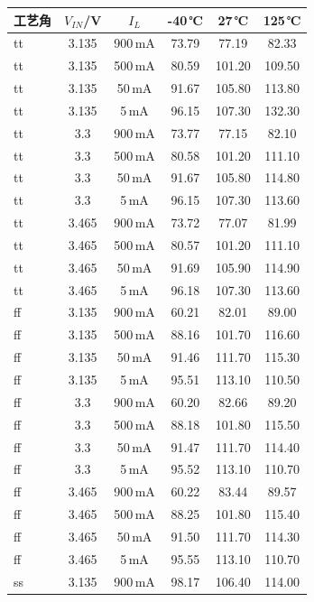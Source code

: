 \documentclass[a4paper, 12pt]{article}
\begin{document}
\begin{table}[H]
  \centering
  \scriptsize
  \setlength{\tabcolsep}{4pt}
  \begin{tabular}{lccccc}
    \toprule
    工艺角 & $V_{IN}$/V & $I_L$ & -40\,℃ & 27\,℃ & 125\,℃ \\
    \midrule
    tt & 3.135 & 900\,mA & 73.79 & 77.19 & 82.33 \\
    tt & 3.135 & 500\,mA & 80.59 & 101.20 & 109.50 \\
    tt & 3.135 & 50\,mA & 91.67 & 105.80 & 113.80 \\
    tt & 3.135 & 5\,mA & 96.15 & 107.30 & 132.30 \\
    tt & 3.3 & 900\,mA & 73.77 & 77.15 & 82.10 \\
    tt & 3.3 & 500\,mA & 80.58 & 101.20 & 111.10 \\
    tt & 3.3 & 50\,mA & 91.67 & 105.80 & 114.80 \\
    tt & 3.3 & 5\,mA & 96.15 & 107.30 & 113.60 \\
    tt & 3.465 & 900\,mA & 73.72 & 77.07 & 81.99 \\
    tt & 3.465 & 500\,mA & 80.57 & 101.20 & 111.10 \\
    tt & 3.465 & 50\,mA & 91.69 & 105.90 & 114.90 \\
    tt & 3.465 & 5\,mA & 96.18 & 107.30 & 113.60 \\
    \midrule
    ff & 3.135 & 900\,mA & 60.21 & 82.01 & 89.00 \\
    ff & 3.135 & 500\,mA & 88.16 & 101.70 & 116.60 \\
    ff & 3.135 & 50\,mA & 91.46 & 111.70 & 115.30 \\
    ff & 3.135 & 5\,mA & 95.51 & 113.10 & 110.50 \\
    ff & 3.3 & 900\,mA & 60.20 & 82.66 & 89.20 \\
    ff & 3.3 & 500\,mA & 88.18 & 101.80 & 115.50 \\
    ff & 3.3 & 50\,mA & 91.47 & 111.70 & 114.40 \\
    ff & 3.3 & 5\,mA & 95.52 & 113.10 & 110.70 \\
    ff & 3.465 & 900\,mA & 60.22 & 83.44 & 89.57 \\
    ff & 3.465 & 500\,mA & 88.25 & 101.80 & 115.40 \\
    ff & 3.465 & 50\,mA & 91.50 & 111.70 & 114.30 \\
    ff & 3.465 & 5\,mA & 95.55 & 113.10 & 110.70 \\
    \midrule
    ss & 3.135 & 900\,mA & 98.17 & 106.40 & 114.00 \\

\end{tabular}
\end{table}
\end{document}
